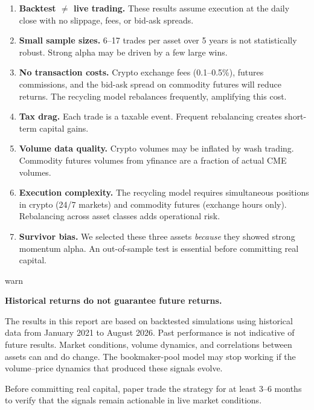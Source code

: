 \documentclass[11pt,a4paper]{article}
\begin{document}
\begin{enumerate}[leftmargin=2em]
    \item \textbf{Backtest $\neq$ live trading.} These results assume
          execution at the daily close with no slippage, fees, or
          bid-ask spreads.

    \item \textbf{Small sample sizes.} 6--17 trades per asset over
          5 years is not statistically robust. Strong alpha may be
          driven by a few large wins.

    \item \textbf{No transaction costs.} Crypto exchange fees
          (0.1--0.5\%), futures commissions, and the bid-ask spread
          on commodity futures will reduce returns. The recycling
          model rebalances frequently, amplifying this cost.

    \item \textbf{Tax drag.} Each trade is a taxable event.
          Frequent rebalancing creates short-term capital gains.

    \item \textbf{Volume data quality.} Crypto volumes may be
          inflated by wash trading. Commodity futures volumes from
          yfinance are a fraction of actual CME volumes.

    \item \textbf{Execution complexity.} The recycling model requires
          simultaneous positions in crypto (24/7 markets) and commodity
          futures (exchange hours only). Rebalancing across asset
          classes adds operational risk.

    \item \textbf{Survivor bias.} We selected these three assets
          \emph{because} they showed strong momentum alpha. An
          out-of-sample test is essential before committing real capital.
\end{enumerate}




\newpage
\begin{resultbox}[]{warn}
\begin{center}
\Large\bfseries Historical returns do not guarantee future returns.
\end{center}

\vspace{0.5em}
The results in this report are based on backtested simulations
using historical data from January 2021 to August 2026. Past
performance is not indicative of future results. Market conditions,
volume dynamics, and correlations between assets can and do change.
The bookmaker-pool model may stop working if the volume--price
dynamics that produced these signals evolve.

\vspace{0.5em}
Before committing real capital, paper trade the strategy for at
least 3--6 months to verify that the signals remain actionable in
live market conditions.
\end{resultbox}
\end{document}
